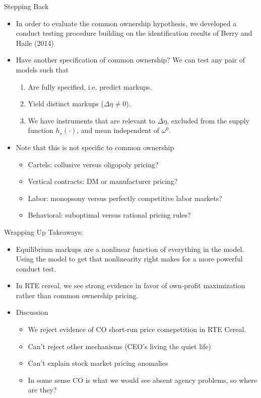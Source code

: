 \documentclass[handout,aspectratio=169,10pt]{beamer}
\begin{document}
\begin{frame}[plain]{Stepping Back}
\begin{itemize}
\item In order to evaluate the common ownership hypothesis, we developed a conduct testing procedure building on the identification results of Berry and Haile (2014)
\pause \item Have another specification of common ownership? We can test any pair of models such that
\begin{enumerate}
\item Are fully specified, i.e. predict markups.
\item Yield distinct markups ($\Delta\eta \neq 0$).
\item We have instruments that are relevant to $\Delta \eta$, excluded from the supply function $h_s(\cdot)$, and mean independent of $\omega^0$.
\end{enumerate}
\pause
\item Note that this is not specific to common ownership
\begin{itemize}
\item Cartels: collusive versus oligopoly pricing? 
\item Vertical contracts: DM  or manufacturer pricing?
\item Labor: monopsony versus perfectly competitive labor markets?
\item Behavioral: suboptimal versus rational pricing rules?
\end{itemize}
\end{itemize}
\end{frame}

\begin{frame}[plain]{Wrapping Up}
Takeaways:
\begin{itemize}
\item Equilibrium markups are a nonlinear function of everything in the model. Using the model to get that nonlinearity right makes for a more powerful conduct test.
\item In RTE cereal, we see strong evidence in favor of own-profit maximization rather than common ownership pricing.
\item Discussion
\begin{itemize}
    \item We reject evidence of CO short-run price comepetition in RTE Cereal.
    \item Can't reject other mechanisms (CEO's living the quiet life)
    \item Can't explain stock market pricing anomalies
    \item In some sense CO is what we would see absent agency problems, so where are they?
\end{itemize}
\end{itemize}
\end{frame}
\end{document}
